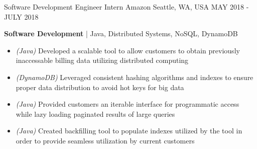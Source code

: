 
\vspace{-.5em}
\begin{cventries}

	\cventry
	{Software Development Engineer Intern} %
	{Amazon} %
	{Seattle, WA, USA} %
	{MAY 2018 - JULY 2018} %
	{
		\begin{cvitems} %
			\item {\textbf{Software Development} | {\color{awesome}Java, Distributed Systems, NoSQL, DynamoDB}
				\begin{itemize}[noitemsep,wide=0pt, leftmargin=\dimexpr{} + 2\relax]
					\item[\textbullet]{\textit{(Java)} Developed a scalable tool to allow customers to obtain previously inaccessable billing data utilizing distributed computing}
					\item[\textbullet]{\textit{(DynamoDB)} Leveraged consistent hashing algorithms and indexes to ensure proper data distribution to avoid hot keys for big data}
					\item[\textbullet]{\textit{(Java)} Provided customers an iterable interface for programmatic access while lazy loading paginated results of large queries}
					\item[\textbullet]{\textit{(Java)} Created backfilling tool to populate indexes utilized by the tool in order to provide seamless utilization by current customers}
				\end{itemize}}
		\end{cvitems}
	}


\end{cventries}
